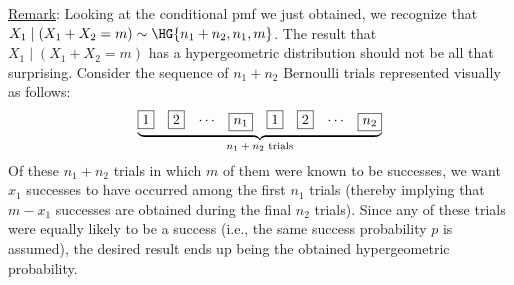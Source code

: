 \underline{Remark}: Looking at the conditional pmf we just obtained, we recognize that $ X_1\mid(X_1+X_2=m)\sim \HG{n_1+n_2,n_1,m} $.
The result that $ X_1\mid(X_1+X_2=m) $ has a hypergeometric distribution should not be all that surprising. Consider the sequence of $ n_1+n_2 $
Bernoulli trials represented visually as follows:
\[ \underbrace{\begin{matrix}
            \boxed{1} & \boxed{2} & \cdots & \boxed{n_1} & \boxed{1} & \boxed{2} & \cdots & \boxed{n_2}
        \end{matrix}}_{\text{$ n_1+n_2 $ trials}} \]
Of these $ n_1+n_2 $ trials in which $ m $ of them were known to be successes, we want $ x_1 $ successes to have occurred among the first $ n_1 $
trials (thereby implying that $ m-x_1 $ successes are obtained during the final $ n_2 $ trials). Since any of these trials were equally likely to be a success
(i.e., the same success probability $p$ is assumed), the desired result ends up being the obtained
hypergeometric probability.
